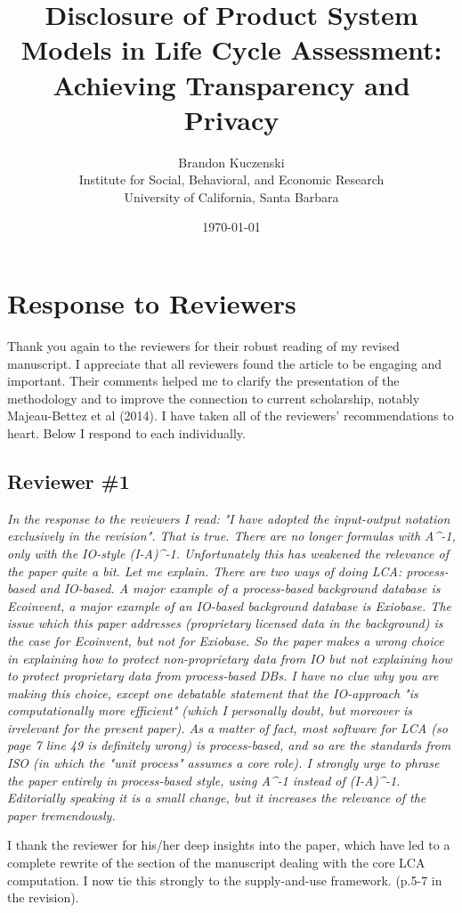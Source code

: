 \documentclass[11pt,letterpaper]{article}
\title{Disclosure of Product System Models in Life Cycle Assessment: Achieving Transparency and Privacy}
\author{Brandon Kuczenski\\
Institute for Social, Behavioral, and Economic Research\\
University of California, Santa Barbara}
\date{\mydate\today}
\begin{document}
\maketitle

\section*{Response to Reviewers}

Thank you again to the reviewers for their robust reading of my revised manuscript.  I appreciate that all reviewers found the article to be engaging and important.  Their comments helped me to clarify the presentation of the methodology and to improve the connection to current scholarship, notably Majeau-Bettez et al (2014).  I have taken all of the reviewers' recommendations to heart.  Below I respond to each individually.

\subsection*{Reviewer \#1}

\emph{In the response to the reviewers I read: "I have adopted the input-output notation exclusively in the revision". That is true. There are no longer formulas with A\^{}-1, only with the IO-style (I-A)\^{}-1. Unfortunately this has weakened the relevance of the paper quite a bit. Let me explain. There are two ways of doing LCA: process-based and IO-based.  A major example of a process-based background database is Ecoinvent, a major example of an IO-based background database is Exiobase. The issue which this paper addresses (proprietary licensed data in the background) is the case for Ecoinvent, but not for Exiobase. So the paper makes a wrong choice in explaining how to protect non-proprietary data from IO but not explaining how to protect proprietary data from process-based DBs. I have no clue why you are making this choice, except one debatable statement that the IO-approach "is computationally more efficient" (which I personally doubt, but moreover is irrelevant for the present paper). As a matter of fact, most software for LCA (so page 7 line 49 is definitely wrong) is process-based, and so are the standards from ISO (in which the "unit process" assumes a core role). I strongly urge to phrase the paper entirely in process-based style, using A\^{}-1 instead of (I-A)\^{}-1. Editorially speaking it is a small change, but it increases the relevance of the paper tremendously.}

I thank the reviewer for his/her deep insights into the paper, which have led to a complete rewrite of the section of the manuscript dealing with the core LCA computation.  I now tie this strongly to the supply-and-use framework. (p.5-7 in the revision).
\end{document}
